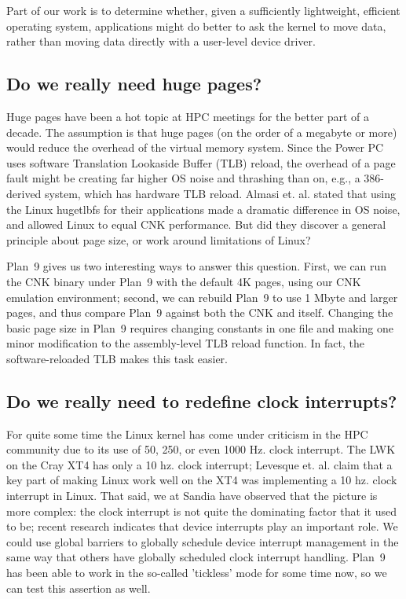 \documentclass[letterpaper,twocolumn,10pt]{article}
\begin{document}
Part of our work is to determine whether, given a sufficiently lightweight, efficient operating system, applications might do better to ask the kernel to move data, rather than moving data directly with a user-level device driver. 
\subsection{Do we really need huge pages?}
Huge pages have been a hot topic at HPC meetings for the better part of a decade. The assumption is that huge pages (on the order of a megabyte or more) would reduce the overhead of the virtual memory system. Since the Power PC uses software Translation Lookaside Buffer (TLB) reload, the overhead of a page fault might be creating far higher OS noise and thrashing than on, e.g., a 386-derived system, which has hardware TLB reload. Almasi et. al.\cite{almasi} stated that using the Linux hugetlbfs for their applications made a dramatic difference in OS noise, and allowed Linux to equal CNK performance. But did they discover a general principle about page size, or work around limitations of Linux? 

Plan~9 gives us two interesting ways to answer this question. First, we can run the CNK binary under Plan~9 with the default 4K pages, using our CNK emulation environment; second, we can rebuild Plan~9 to use 1 Mbyte and larger pages, and thus compare Plan~9 against both the CNK and itself. Changing the basic page size in Plan~9 requires changing constants in one file and making one minor modification to the assembly-level TLB reload function. In fact, the software-reloaded TLB makes this task easier.  
\subsection{Do we really need to redefine clock interrupts?}
For quite some time the Linux kernel has come under criticism in the HPC community due to its use of 50, 250, or even 1000 Hz. clock interrupt. The LWK on the Cray XT4 has only a 10 hz. clock interrupt; Levesque et. al.\cite{levesque} claim that a key part of making Linux work well on the XT4 was implementing a 10 hz. clock interrupt in Linux. That said, we at Sandia have observed that the picture is more complex: the clock interrupt is not quite the dominating factor that it used to be; recent research indicates that device interrupts play an important role. We could use global barriers to globally schedule device interrupt management in the same way that others have globally scheduled clock interrupt handling. Plan~9 has been able to work in the so-called 'tickless' mode for some time now, so we can test this assertion as well. 
\end{document}

